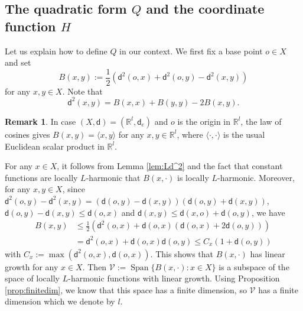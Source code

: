 \documentclass[JEP,XML,SOM,Unicode,published]{cedram}
\theoremstyle{plain}
\theoremstyle{definition}
\newtheorem{remark}[theorem]{Remark}
\newcommand{\setR}{\mathbb{R}}
\newcommand{\cV}{\mathcal{V}}
\newcommand{\scal}[2]{\ensuremath{\langle #1, #2 \rangle}}
\newcommand{\dist}{\mathsf{d}}
\DeclareMathOperator{\Span}{Span}
\begin{document}
\subsection{The quadratic form $Q$ and the coordinate function $H$}\label{subsec:4.1}

Let us explain how to define $Q$ in our context. We first fix a base point $o \in X$ and set
\[
B(x,y):=\frac{1}{2}(\dist^2(o,x)+\dist^2(o,y)-\dist^2(x,y))
\]for any $x,y \in X$. Note that
\begin{equation}\label{eq:D6.1}
\dist^2(x,y)= B(x,x)+B(y,y)-2B(x,y).
\end{equation}

\begin{remark}
In case $(X,\dist)=(\setR^l,\dist_{e})$ and $o$ is the origin in $\setR^l$, the law of cosines gives $B(x,y)=\scal{x}{y}$ for any $x,y \in \setR^l$, where $\scal{\cdot}{\cdot}$ is the usual Euclidean scalar product in $\setR^l$.
\end{remark}

For any $x \in X$, it follows from Lemma \ref{lem:Ld^2} and the fact that constant functions are locally $L$-harmonic that $B(x,\cdot)$ is locally $L$-harmonic. Moreover, for any $x,y \in X$, since $\dist^2(o,y)-\dist^2(x,y) = (\dist(o,y)-\dist(x,y))(\dist(o,y)+\dist(x,y))$, $\dist(o,y)-\dist(x,y)\le \dist(o,x)$ and $\dist(x,y)\le \dist(x,o)+\dist(o,y)$, we have
\begin{align*}
B(x,y) & \le \frac{1}{2}(\dist^2(o,x)+\dist(o,x)(\dist(o,x)+2\dist(o,y)))\\
& = \dist^2(o,x)+\dist(o,x)\dist(o,y) \le C_x(1+\dist(o,y))
\end{align*}
with $C_x:=\max(\dist^2(o,x),\dist(o,x))$. This shows that $B(x,\cdot)$ has linear growth for any $x \in X$. Then $\cV:=\Span\{B(x,\cdot): x \in X\}$ is a subspace of the space of locally $L$\nobreakdash-harmonic functions with linear growth. Using Proposition \ref{prop:finitedim}, we know that this space has a finite dimension, so $\cV$ has a finite dimension which we denote by $l$.
\end{document}
